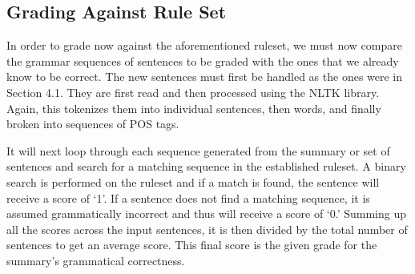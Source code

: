 \documentclass[11pt,a4paper]{article}
\begin{document}
\begin{multicols}{2}
\subsection{Grading Against Rule Set}
In order to grade now against the aforementioned ruleset, we must now compare the grammar sequences of sentences to be graded with the ones that we already know to be correct. The new sentences must first be handled as the ones were in Section 4.1. They are first read and then processed using the NLTK library. Again, this tokenizes them into individual sentences, then words, and finally broken into sequences of POS tags.

It will next loop through each sequence generated from the summary or set of sentences and search for a matching sequence in the established ruleset. A binary search is performed on the ruleset and if a match is found, the sentence will receive a score of `1'. If a sentence does not find a matching sequence, it is assumed grammatically incorrect and thus will receive a score of `0.' Summing up all the scores across the input sentences, it is then divided by the total number of sentences to get an average score. This final score is the given grade for the summary's grammatical correctness.


\end{multicols}
\end{document}

